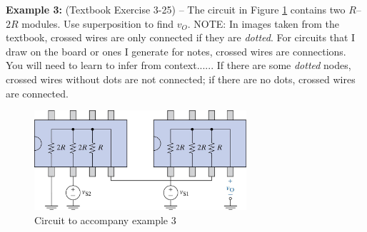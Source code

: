 \documentclass{handout}
\begin{document}
\newpage
\clearpage
\pagebreak

\textbf{Example 3:} (Textbook Exercise 3-25) -- The circuit in Figure \ref{fig: Example3} contains two $R$--$2R$ modules.  Use superposition to find $v_O$.  NOTE: In images taken from the textbook, crossed wires are only connected if they are {\em dotted}.  For circuits that I draw on the board or ones I generate for notes, crossed wires are connections.  You will need to learn to infer from context...... If there are some {\em dotted} nodes, crossed wires without dots are not connected; if there are no dots, crossed wires are connected.
\begin{figure} [h t b]
\centering
\includegraphics[width=0.7\textwidth]{Example3.jpg}
\caption{Circuit to accompany example 3}
\label{fig: Example3}
\end{figure}
\end{document}

